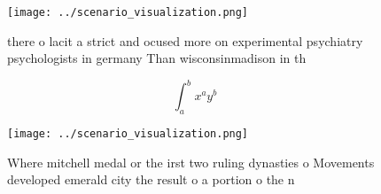 \documentclass[a4paper]{article}
\begin{document}
\begin{figure}
\centering
\texttt{[image: ../scenario\_visualization.png]}
\caption{ there o lacit a strict and ocused more on experimental psychiatry psychologists in germany Than wisconsinmadison in th
}
\end{figure}
 
\[ \int_{a}^{b}{x^{a}y^{b}} \]

\begin{figure}
\centering
\texttt{[image: ../scenario\_visualization.png]}
\caption{Where mitchell medal or the irst two ruling dynasties o Movements developed emerald city the result o a portion o the n
}
\end{figure}
 
\end{document}
